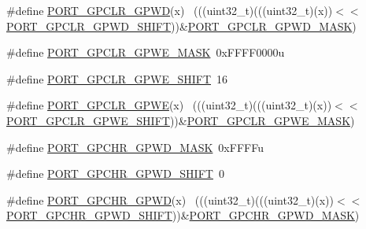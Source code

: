 \begin{DoxyCompactItemize}
\item 
\#define \hyperlink{group___p_o_r_t___register___masks_gab9daa192b3e0c7d1bf44689b960c5a4f}{P\+O\+R\+T\+\_\+\+G\+P\+C\+L\+R\+\_\+\+G\+P\+WD}(x)                                          ~(((uint32\+\_\+t)(((uint32\+\_\+t)(x))$<$$<$\hyperlink{group___p_o_r_t___register___masks_gaafacaac0aa215f596b947609857d6491}{P\+O\+R\+T\+\_\+\+G\+P\+C\+L\+R\+\_\+\+G\+P\+W\+D\+\_\+\+S\+H\+I\+FT}))\&\hyperlink{group___p_o_r_t___register___masks_gaa7e4a890e9d09d85279889ce3ecb0044}{P\+O\+R\+T\+\_\+\+G\+P\+C\+L\+R\+\_\+\+G\+P\+W\+D\+\_\+\+M\+A\+SK})
\item 
\#define \hyperlink{group___p_o_r_t___register___masks_ga49c4160370859546837be80a2eed1365}{P\+O\+R\+T\+\_\+\+G\+P\+C\+L\+R\+\_\+\+G\+P\+W\+E\+\_\+\+M\+A\+SK}~0x\+F\+F\+F\+F0000u
\item 
\#define \hyperlink{group___p_o_r_t___register___masks_ga340d6aadd9516b3cac26187b014ce9d3}{P\+O\+R\+T\+\_\+\+G\+P\+C\+L\+R\+\_\+\+G\+P\+W\+E\+\_\+\+S\+H\+I\+FT}~16
\item 
\#define \hyperlink{group___p_o_r_t___register___masks_ga82584460ead116af92e0d8d2ce15a88e}{P\+O\+R\+T\+\_\+\+G\+P\+C\+L\+R\+\_\+\+G\+P\+WE}(x)                                          ~(((uint32\+\_\+t)(((uint32\+\_\+t)(x))$<$$<$\hyperlink{group___p_o_r_t___register___masks_ga340d6aadd9516b3cac26187b014ce9d3}{P\+O\+R\+T\+\_\+\+G\+P\+C\+L\+R\+\_\+\+G\+P\+W\+E\+\_\+\+S\+H\+I\+FT}))\&\hyperlink{group___p_o_r_t___register___masks_ga49c4160370859546837be80a2eed1365}{P\+O\+R\+T\+\_\+\+G\+P\+C\+L\+R\+\_\+\+G\+P\+W\+E\+\_\+\+M\+A\+SK})
\item 
\#define \hyperlink{group___p_o_r_t___register___masks_ga4f288d1140184d41384f459c263d6e63}{P\+O\+R\+T\+\_\+\+G\+P\+C\+H\+R\+\_\+\+G\+P\+W\+D\+\_\+\+M\+A\+SK}~0x\+F\+F\+F\+Fu
\item 
\#define \hyperlink{group___p_o_r_t___register___masks_gab4464bb98b737fbf75d42682fef3c09c}{P\+O\+R\+T\+\_\+\+G\+P\+C\+H\+R\+\_\+\+G\+P\+W\+D\+\_\+\+S\+H\+I\+FT}~0
\item 
\#define \hyperlink{group___p_o_r_t___register___masks_ga4bcc0d29943f201d35379c59dced6f5a}{P\+O\+R\+T\+\_\+\+G\+P\+C\+H\+R\+\_\+\+G\+P\+WD}(x)                                          ~(((uint32\+\_\+t)(((uint32\+\_\+t)(x))$<$$<$\hyperlink{group___p_o_r_t___register___masks_gab4464bb98b737fbf75d42682fef3c09c}{P\+O\+R\+T\+\_\+\+G\+P\+C\+H\+R\+\_\+\+G\+P\+W\+D\+\_\+\+S\+H\+I\+FT}))\&\hyperlink{group___p_o_r_t___register___masks_ga4f288d1140184d41384f459c263d6e63}{P\+O\+R\+T\+\_\+\+G\+P\+C\+H\+R\+\_\+\+G\+P\+W\+D\+\_\+\+M\+A\+SK})
$$
\end{DoxyCompactItemize}
